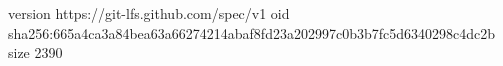 version https://git-lfs.github.com/spec/v1
oid sha256:665a4ca3a84bea63a66274214abaf8fd23a202997c0b3b7fc5d6340298c4dc2b
size 2390
